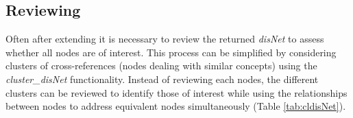 \documentclass[9pt,a4paper,]{extarticle}
\begin{document}
\hypertarget{reviewing}{%
\subsection{Reviewing}\label{reviewing}}

Often after extending it is necessary to review the returned \emph{disNet} to assess whether all nodes are of interest. This process can be simplified by considering clusters of cross-references (nodes dealing with similar concepts) using the \emph{cluster\_disNet} functionality. Instead of reviewing each nodes, the different clusters can be reviewed to identify those of interest while using the relationships between nodes to address equivalent nodes simultaneously (Table \ref{tab:cldisNet}).

\begin{table}


\end{table}
\end{document}
